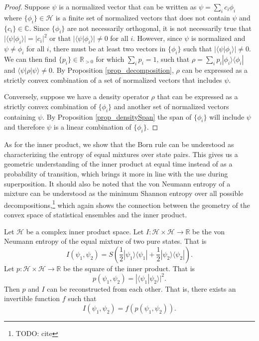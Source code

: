 \documentclass[10pt,twocolumn, nofootinbib]{revtex4-2}
\def\>{\rangle}
\def\<{\langle}
\begin{document}
\begin{proof}
Suppose $\psi$ is a normalized vector that can be written as $\psi = \sum_{i} c_i \phi_i$ where $\{\phi_i\} \in \mathcal{H}$ is a finite set of normalized vectors that does not contain $\psi$ and $\{c_i\} \in \mathbb{C}$. Since $\{\phi_i\}$ are not necessarily orthogonal, it is not necessarily true that $|\<\psi|\phi_i\>| = |c_i|^2$ or that $|\<\psi|\phi_i\>| \neq 0$ for all $i$. However, since $\psi$ is normalized and $\psi \neq \phi_i$ for all $i$, there must be at least two vectors in $\{\phi_i\}$ such that $|\<\psi|\phi_i\>| \neq 0$. We can then find $\{p_i\} \in \mathbb{R}_{>0}$ for which $\sum_i p_i =1$, such that $\rho = \sum_i p_i |\phi_i\>\<\phi_i|$ and $\<\psi|\rho|\psi\> \neq 0$. By Proposition \ref{prop_decomposition}, $\rho$ can be expressed as a strictly convex combination of a set of normalized vectors that includes $\psi$.

Conversely, suppose we have a density operator $\rho$ that can be expressed as a strictly convex combination of $\{\phi_i\}$ and another set of normalized vectors containing $\psi$. By Proposition \ref{prop_densitySpan} the span of $\{\phi_i\}$ will include $\psi$ and therefore $\psi$ is a linear combination of $\{\phi_i\}$.
\end{proof}

As for the inner product, we show that the Born rule can be understood as characterizing the entropy of equal mixtures over state pairs. This gives us a geometric understanding of the inner product at equal time instead of as a probability of transition, which brings it more in line with the use during superposition. It should also be noted that the von Neumann entropy of a mixture can be understood as the minimum Shannon entropy over all possible decompositions,\footnote{TODO: cite} which again shows the connection between the geometry of the convex space of statistical ensembles and the inner product.

\begin{prop}\label{prop_innerProductIsEntropy}
Let $\mathcal{H}$ be a complex inner product space. Let $I : \mathcal{H} \times \mathcal{H} \to \mathbb{R}$ be the von Neumann entropy of the equal mixture of two pure states. That is
\begin{equation}
I(\psi_1, \psi_2) = S\left(\frac{1}{2}|\psi_1\>\<\psi_1| + \frac{1}{2}|\psi_2\>\<\psi_2|\right).
\end{equation}
Let $p : \mathcal{H} \times \mathcal{H} \to \mathbb{R}$ be the square of the inner product. That is
\begin{equation}
p(\psi_1, \psi_2) = |\<\psi_1| \psi_2\>|^2.
\end{equation}
Then $p$ and $I$ can be reconstructed from each other. That is, there exists an invertible function $f$ such that
\begin{equation}
I(\psi_1, \psi_2) = f(p(\psi_1, \psi_2)).
\end{equation}
\end{prop}
\end{document}
